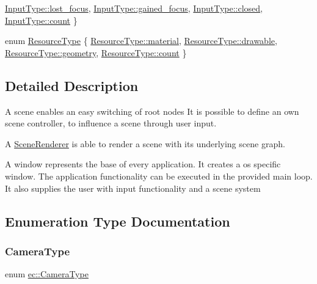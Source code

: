 \begin{DoxyCompactItemize}
\mbox{\hyperlink{namespaceec_a5de6bdb8c4b2ed6e590e721ec998f964ac3e76686badae4b6d625c39e41b23521}{Input\+Type\+::lost\+\_\+focus}}, 
\mbox{\hyperlink{namespaceec_a5de6bdb8c4b2ed6e590e721ec998f964a4a46fc9d3e3456efe6a3980f2f3fbcc0}{Input\+Type\+::gained\+\_\+focus}}, 
\mbox{\hyperlink{namespaceec_a5de6bdb8c4b2ed6e590e721ec998f964a349e686330723975502e9ef4f939a5ac}{Input\+Type\+::closed}}, 
\newline
\mbox{\hyperlink{namespaceec_a5de6bdb8c4b2ed6e590e721ec998f964ae2942a04780e223b215eb8b663cf5353}{Input\+Type\+::count}}
 \}
\item 
enum \mbox{\hyperlink{namespaceec_ae4420ccd0f79418a5ce075e43909289f}{Resource\+Type}} \{ \mbox{\hyperlink{namespaceec_ae4420ccd0f79418a5ce075e43909289faeec34d804c9ce6c89cff596be555e6a4}{Resource\+Type\+::material}}, 
\mbox{\hyperlink{namespaceec_ae4420ccd0f79418a5ce075e43909289fac571a3227368b17e0ecc38a2a417e201}{Resource\+Type\+::drawable}}, 
\mbox{\hyperlink{namespaceec_ae4420ccd0f79418a5ce075e43909289faed7daeb157cd9b31e53896ad3c771a26}{Resource\+Type\+::geometry}}, 
\mbox{\hyperlink{namespaceec_ae4420ccd0f79418a5ce075e43909289fae2942a04780e223b215eb8b663cf5353}{Resource\+Type\+::count}}
 \}
\end{DoxyCompactItemize}


\subsection{Detailed Description}
A scene enables an easy switching of root nodes It is possible to define an own scene controller, to influence a scene through user input.

A \mbox{\hyperlink{classec_1_1_scene_renderer}{Scene\+Renderer}} is able to render a scene with its underlying scene graph.

A window represents the base of every application. It creates a os specific window. The application functionality can be executed in the provided main loop. It also supplies the user with input functionality and a scene system 

\subsection{Enumeration Type Documentation}
\mbox{\label{namespaceec_aeb1f95f6e5d6c17c5a67f68e44746ac4}} 
\subsubsection{\texorpdfstring{Camera\+Type}{CameraType}}
{\footnotesize\ttfamily enum \mbox{\hyperlink{namespaceec_aeb1f95f6e5d6c17c5a67f68e44746ac4}{ec\+::\+Camera\+Type}}\hspace{0.3cm}{\ttfamily [strong]}}

